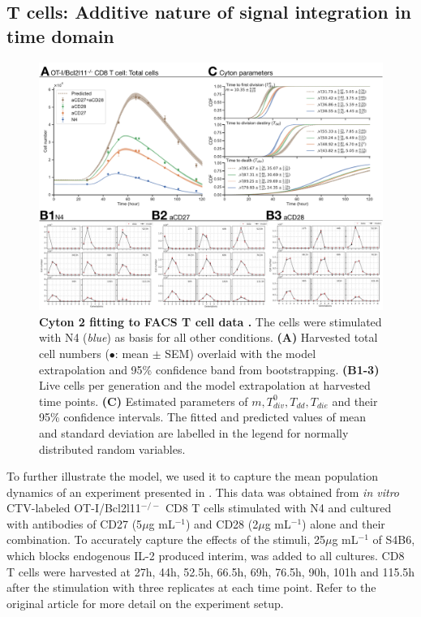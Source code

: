 \documentclass[11pt, a4paper]{article}
\begin{document}
\nolinenumbers
\subsection{T cells: Additive nature of signal integration in time domain}
\begin{figure}[t]
    \centering
    \includegraphics[scale=0.6]{figs/fig6.pdf}
    \caption{\textbf{Cyton 2 fitting to FACS T cell data \parencite{Marchingo.2014}.} The cells were stimulated with N4 (\textit{blue}) as basis for all other conditions. \textbf{(A)} Harvested total cell numbers ($\bullet$: mean $\pm$ SEM) overlaid with the model extrapolation and 95\% confidence band from bootstrapping. \textbf{(B1-3)} Live cells per generation and the model extrapolation at harvested time points. \textbf{(C)} Estimated parameters of $m, T_{div}^0, T_{dd}, T_{die}$ and their 95\% confidence intervals. The fitted and predicted values of mean and standard deviation are labelled in the legend for normally distributed random variables.}
    \label{fig:application}
\end{figure}
\linenumbers
To further illustrate the model, we used it to capture the mean population dynamics of an experiment presented in \cite{Marchingo.2014}. This data was obtained from \textit{in vitro} CTV-labeled OT-I/Bcl2l11$^{-/-}$ CD8 T cells stimulated with N4 and cultured with antibodies of CD27 (5$\mu$g mL$^{-1}$) and CD28 (2$\mu$g mL$^{-1}$) alone and their combination. To accurately capture the effects of the stimuli, 25$\mu$g mL$^{-1}$ of S4B6, which blocks endogenous IL-2 produced interim, was added to all cultures. CD8 T cells were harvested at 27h, 44h, 52.5h, 66.5h, 69h, 76.5h, 90h, 101h and 115.5h after the stimulation with three replicates at each time point. Refer to the original article for more detail on the experiment setup.
\end{document}
